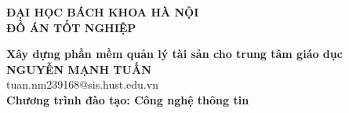 \documentclass[DoAn.tex]{subfiles}
\begin{document}
\begin{titlepage}
\thispagestyle{empty}
\begin{center}

{\textbf{\large{ĐẠI HỌC BÁCH KHOA HÀ NỘI}}}\\[3cm]

{\textbf{\huge{ ĐỒ ÁN TỐT NGHIỆP}}}\\[1cm]
{\textbf{\Large{Xây dựng phần mềm quản lý tài sản cho trung tâm giáo dục}}\\[1cm]

{\textbf{\large{NGUYỄN MẠNH TUẤN}}}\\
{\large{tuan.nm239168@sis.hust.edu.vn}}\\[0.5cm]

{\textbf{\large{Chương trình đào tạo: Công nghệ thông tin 
}}}\\

\vspace{4cm}
\begin{table}[H]
\centering
{}
\end{table}}
\end{center}



\end{titlepage}
\end{document}

